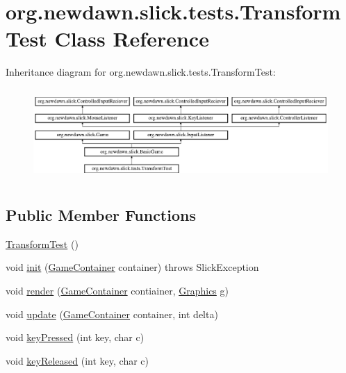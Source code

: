 \hypertarget{classorg_1_1newdawn_1_1slick_1_1tests_1_1_transform_test}{}\section{org.\+newdawn.\+slick.\+tests.\+Transform\+Test Class Reference}
\label{classorg_1_1newdawn_1_1slick_1_1tests_1_1_transform_test}
Inheritance diagram for org.\+newdawn.\+slick.\+tests.\+Transform\+Test\+:\begin{figure}[H]
\begin{center}
\leavevmode
\includegraphics[height=3.522012cm]{classorg_1_1newdawn_1_1slick_1_1tests_1_1_transform_test}
\end{center}
\end{figure}
\subsection*{Public Member Functions}
\begin{DoxyCompactItemize}
\item 
\mbox{\hyperlink{classorg_1_1newdawn_1_1slick_1_1tests_1_1_transform_test_a9842c748eea04a509dd47a049c877d35}{Transform\+Test}} ()
\item 
void \mbox{\hyperlink{classorg_1_1newdawn_1_1slick_1_1tests_1_1_transform_test_a02c6b90af96ba846d8b48b5f9d7783e8}{init}} (\mbox{\hyperlink{classorg_1_1newdawn_1_1slick_1_1_game_container}{Game\+Container}} container)  throws Slick\+Exception 
\item 
void \mbox{\hyperlink{classorg_1_1newdawn_1_1slick_1_1tests_1_1_transform_test_a928dd1a413227df47f44cf4d9ab05b98}{render}} (\mbox{\hyperlink{classorg_1_1newdawn_1_1slick_1_1_game_container}{Game\+Container}} contiainer, \mbox{\hyperlink{classorg_1_1newdawn_1_1slick_1_1_graphics}{Graphics}} g)
\item 
void \mbox{\hyperlink{classorg_1_1newdawn_1_1slick_1_1tests_1_1_transform_test_a314f8f1c057599f9af7c8036b28a4c3e}{update}} (\mbox{\hyperlink{classorg_1_1newdawn_1_1slick_1_1_game_container}{Game\+Container}} container, int delta)
\item 
void \mbox{\hyperlink{classorg_1_1newdawn_1_1slick_1_1tests_1_1_transform_test_af22d2326472f2119364c3bbe40ec02db}{key\+Pressed}} (int key, char c)
\item 
void \mbox{\hyperlink{classorg_1_1newdawn_1_1slick_1_1tests_1_1_transform_test_a418cf1065d117540939795dff77a226c}{key\+Released}} (int key, char c)
\end{DoxyCompactItemize}
